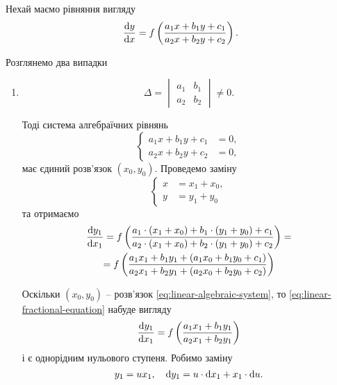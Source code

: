 Нехай маємо рівняння вигляду
\begin{equation*}
	\label{eq:linear-fractional-equation}
	\frac{\mathop{}\!\mathrm{d} y}{\mathop{}\!\mathrm{d} x} = f \left( \frac{a_1 x + b_1 y + c_1}{a_2 x + b_2 y + c_2} \right).
\end{equation*}

Розглянемо два випадки
\begin{enumerate}
	\item 
	\begin{equation*}
		\Delta = \begin{vmatrix} a_1 & b_1 \\ a_2 & b_2 \end{vmatrix} \ne 0.
	\end{equation*}

	Тоді система алгебраїчних рівнянь
	\begin{equation*}
		\label{eq:linear-algebraic-system}
		\left\{
			\begin{aligned}
				a_1 x + b_1 y + c_1 &= 0, \\
				a_2 x + b_2 y + c_2 &= 0,
			\end{aligned}
		\right.
	\end{equation*}
	має єдиний розв’язок $(x_0, y_0)$. Проведемо заміну 
	\begin{equation*}
		\left\{\begin{aligned}
			x &= x_1 + x_0, \\
			y &= y_1 + y_0
		\end{aligned}\right.
	\end{equation*}
	та отримаємо
	\begin{multline}
		\frac{\mathop{}\!\mathrm{d} y_1}{\mathop{}\!\mathrm{d} x_1} = f \left( \frac{a_1 \cdot (x_1 + x_0) + b_1 \cdot (y_1 + y_0) + c_1}{a_2 \cdot (x_1 + x_0) + b_2 \cdot (y_1 + y_0) + c_2} \right) = \\
		= f \left( \frac{a_1 x_1 + b_1 y_1 + (a_1 x_0 + b_1 y_0 + c_1)}{a_2 x_1 + b_2 y_1 + (a_2 x_0 + b_2 y_0 + c_2)} \right)
	\end{multline}

	Оскільки $(x_0, y_0)$ -- розв’язок \eqref{eq:linear-algebraic-system}, то \eqref{eq:linear-fractional-equation} набуде вигляду
	\begin{equation*}
		\frac{\mathop{}\!\mathrm{d} y_1}{\mathop{}\!\mathrm{d} x_1} = f \left( \frac{a_1 x_1 + b_1 y_1}{a_2 x_1 + b_2 y_1} \right)
	\end{equation*}
	і є однорідним нульового ступеня. Робимо заміну 
	\begin{equation*}
		y_1 = u x_1, \quad \mathop{}\!\mathrm{d} y_1 = u \cdot \mathop{}\!\mathrm{d} x_1 + x_1 \cdot \mathop{}\!\mathrm{d} u.
	\end{equation*}


\end{enumerate}
